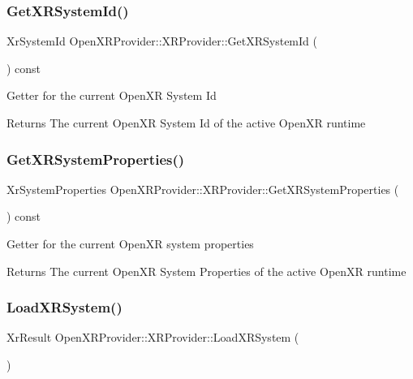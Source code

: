 \subsubsection{\texorpdfstring{GetXRSystemId()}{GetXRSystemId()}}
{\footnotesize\ttfamily Xr\+System\+Id Open\+X\+R\+Provider\+::\+X\+R\+Provider\+::\+Get\+X\+R\+System\+Id (\begin{DoxyParamCaption}{ }\end{DoxyParamCaption}) const\hspace{0.3cm}{\ttfamily [inline]}}

Getter for the current Open\+XR System Id \begin{DoxyReturn}{Returns}
The current Open\+XR System Id of the active Open\+XR runtime 
\end{DoxyReturn}
\mbox{\label{class_open_x_r_provider_1_1_x_r_provider_a6a1d17df601888feeb5481fc1d49bae2}} 
\subsubsection{\texorpdfstring{GetXRSystemProperties()}{GetXRSystemProperties()}}
{\footnotesize\ttfamily Xr\+System\+Properties Open\+X\+R\+Provider\+::\+X\+R\+Provider\+::\+Get\+X\+R\+System\+Properties (\begin{DoxyParamCaption}{ }\end{DoxyParamCaption}) const\hspace{0.3cm}{\ttfamily [inline]}}

Getter for the current Open\+XR system properties \begin{DoxyReturn}{Returns}
The current Open\+XR System Properties of the active Open\+XR runtime 
\end{DoxyReturn}
\mbox{\label{class_open_x_r_provider_1_1_x_r_provider_a1bd2735b39ea943cd9e436bb0650bc43}} 
\subsubsection{\texorpdfstring{LoadXRSystem()}{LoadXRSystem()}}
{\footnotesize\ttfamily Xr\+Result Open\+X\+R\+Provider\+::\+X\+R\+Provider\+::\+Load\+X\+R\+System (\begin{DoxyParamCaption}{ }\end{DoxyParamCaption})\hspace{0.3cm}{\ttfamily [private]}}

